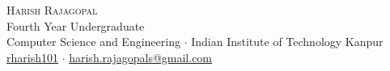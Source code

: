 \newcommand{\sep}{$\cdot$}%
\newcommand{\gmail}{harish.rajagopals@gmail.com}

\begin{center}

\textsc{\huge Harish Rajagopal}\\[2mm]
Fourth Year Undergraduate\\[1mm]
Computer Science and Engineering \sep{} Indian Institute of Technology Kanpur\\[1mm]
\faGithub{} \href{https://github.com/rharish101}{rharish101} \sep{}
\faEnvelopeO{} \href{mailto:\gmail}{\gmail}

\end{center}

